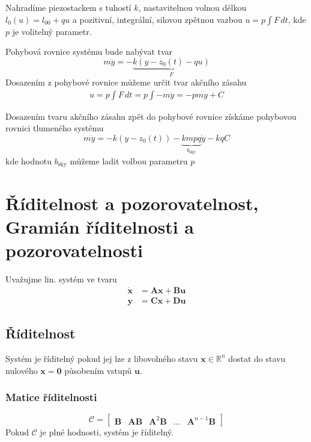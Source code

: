 \documentclass{article}
\begin{document}
	Nahradíme piezostackem s tuhostí $k$, nastavitelnou volnou délkou $l_0(u) = l_{00} + qu$ a pozitivní, integrální, silovou zpětnou vazbou $u = p \int F\,dt$, kde $p$ je volitelný parametr.

	Pohybová rovnice systému bude nabývat tvar
	\begin{equation}
		m\ddot{y} = - \underbrace{k ( y-z_0(t)-qu)}_{F}
	\end{equation}
	Dosazením z pohybové rovnice můžeme určit tvar akčního zásahu
	\begin{align}
		u = p \int F\,dt = p \int -m\ddot{y} = -pm\dot{y} + C
	\end{align}

	Dosazením tvaru akčního zásahu zpět do pohybové rovnice získáme pohybovou rovnici tlumeného systému
	\begin{equation}
		m\ddot{y} = -k (y-z_0(t)) - \underbrace{kmpq}_{b_{\text{sky}}}\dot{y} - kqC
	\end{equation}
	kde hodnotu $b_{\text{sky}}$ můžeme ladit volbou parametru $p$

	\section{Říditelnost a pozorovatelnost, Gramián říditelnosti a pozorovatelnosti}

	Uvažujme lin. systém ve tvaru
	\begin{align*}
		\bm{\dot{x}} &= \bm{A}\bm{x} + \bm{B}\bm{u} \\
		\bm{y} &= \bm{C}\bm{x} + \bm{D}\bm{u}
	\end{align*}

	\subsection*{Říditelnost}
	Systém je říditelný pokud jej lze z libovolného stavu $\bm{x} \in \mathbb{R}^n$ dostat do stavu nulového $\bm{x} = \bm{0}$ působením vstupů $\bm{u}$.

	\subsubsection*{Matice říditelnosti}
	\begin{equation}
		\bm{\mathcal{C}}
		=
		\begin{bmatrix}
			\bm{B} & \bm{A} \bm{B} & \bm{A}^{2} \bm{B} & \dots & \bm{A}^{n-1} \bm{B}
		\end{bmatrix}
	\end{equation}
	Pokud $\bm{\mathcal{C}}$ je plné hodnosti, systém je říditelný.
\end{document}

